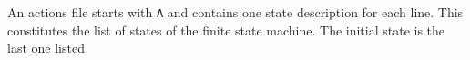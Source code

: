 An actions file starts with {\tt A} and contains
one state description for each line. This constitutes the list of states 
of the finite state machine. The initial state is the last one listed